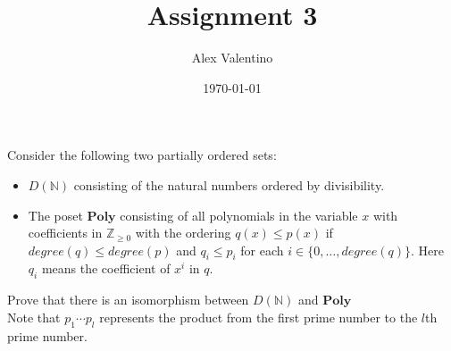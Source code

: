 \documentclass[12pt, letterpaper]{article}
\date{\today}
\author{Alex Valentino}
\title{Assignment 3}
\begin{document}
 Consider the following two partially ordered sets:
\begin{itemize}
\item $D(\mathbb{N})$ consisting of the natural numbers ordered by divisibility.
\item The poset $\textbf{Poly}$ consisting of all polynomials in the variable $x$ with
coefficients in $\mathbb{Z}_{\geq 0}$ with the ordering $q(x) \leq p(x)$ if
$degree(q) \leq degree(p)$ and $q_i \leq p_i$ for each $i \in \{0,\ldots,degree(q)\}$. Here $q_i$ means the coefficient of $x^i$ in $q$.\end{itemize}
Prove that  there is an isomorphism between $D(\mathbb{N})$ and $\textbf{Poly}$\\


Note that $p_1\cdots p_l$ represents the product from the first prime number to the $l$th prime number.\\  
\end{document}
